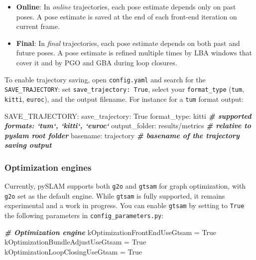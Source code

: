\documentclass{article}
\newenvironment{Shaded}{\begin{snugshade}}{\end{snugshade}}
\newcommand{\CommentTok}[1]{\textcolor[rgb]{0.00,0.40,1.00}{\textbf{\textit{#1}}}}
\newcommand{\ExtensionTok}[1]{\textcolor[rgb]{0.74,0.68,0.62}{#1}}
\newcommand{\NormalTok}[1]{\textcolor[rgb]{0.74,0.68,0.62}{#1}}
\newcommand{\OperatorTok}[1]{\textcolor[rgb]{0.74,0.68,0.62}{#1}}
\newcommand{\VariableTok}[1]{\textcolor[rgb]{0.74,0.68,0.62}{#1}}
\providecommand{\tightlist}{%
  \setlength{\itemsep}{0pt}\setlength{\parskip}{0pt}}
\begin{document}
\begin{itemize}
\tightlist
\item
  \textbf{Online}: In \emph{online} trajectories, each pose estimate
  depends only on past poses. A pose estimate is saved at the end of
  each front-end iteration on current frame.
\item
  \textbf{Final}: In \emph{final} trajectories, each pose estimate
  depends on both past and future poses. A pose estimate is refined
  multiple times by LBA windows that cover it and by PGO and GBA during
  loop closures.
\end{itemize}

To enable trajectory saving, open \texttt{config.yaml} and search for
the \texttt{SAVE\_TRAJECTORY}: set \texttt{save\_trajectory:\ True},
select your \texttt{format\_type} (\texttt{tum}, \texttt{kitti},
\texttt{euroc}), and the output filename. For instance for a
\texttt{tum} format output: \\

\begin{scriptsize}
\begin{Shaded}
\begin{Highlighting}[]
\ExtensionTok{SAVE_TRAJECTORY}\NormalTok{:}
  \ExtensionTok{save_trajectory}\NormalTok{: True}
  \ExtensionTok{format_type}\NormalTok{: kitti             }\CommentTok{# supported formats: `tum`, `kitti`, `euroc`}
  \ExtensionTok{output_folder}\NormalTok{: results/metrics }\CommentTok{# relative to pyslam root folder }
  \ExtensionTok{basename}\NormalTok{: trajectory           }\CommentTok{# basename of the trajectory saving output}
\end{Highlighting}
\end{Shaded}
\end{scriptsize}

\hypertarget{optimization-engines}{%
\subsubsection{Optimization engines}\label{optimization-engines}}

Currently, pySLAM supports both \texttt{g2o} and \texttt{gtsam} for
graph optimization, with \texttt{g2o} set as the default engine. While
\texttt{gtsam} is fully supported, it remains experimental and a work in
progress. You can enable \texttt{gtsam} by setting to \texttt{True} the
following parameters in \texttt{config\_parameters.py}:

\begin{scriptsize}
  \begin{Shaded}
    \begin{Highlighting}[]
      \CommentTok{# Optimization engine }
    \NormalTok{  kOptimizationFrontEndUseGtsam }\OperatorTok{=} \VariableTok{True}    
    \NormalTok{  kOptimizationBundleAdjustUseGtsam }\OperatorTok{=} \VariableTok{True} 
    \NormalTok{  kOptimizationLoopClosingUseGtsam }\OperatorTok{=} \VariableTok{True} 
    \end{Highlighting}
    \end{Shaded}
\end{scriptsize}
\end{document}
